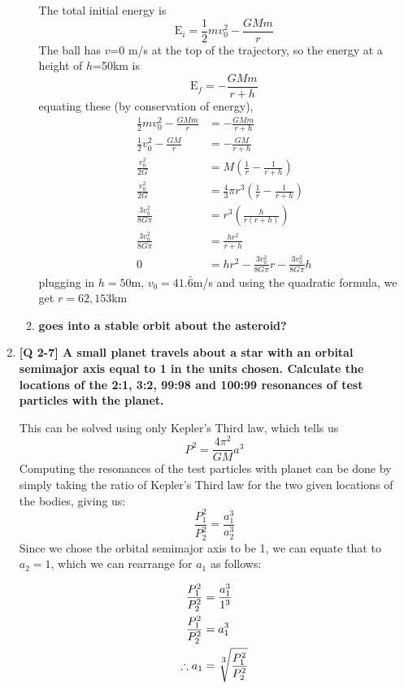\documentclass[10pt]{article}
\begin{document}
\begin{enumerate}
\begin{enumerate}
			The total initial energy is
			\[ \text{E}_i = \frac{1}{2}mv_0^2 - \frac{GMm}{r} \]
			The ball has $v$=0 m/s at the top of the trajectory, so the energy at a height of $h$=50km is
			\[ \text{E}_f = -\frac{GMm}{r + h} \]
			equating these (by conservation of energy),
			\begin{align*}
			    \frac{1}{2}mv_0^2 - \frac{GMm}{r} &= -\frac{GMm}{r+h}  \\
			    \frac{1}{2}v_0^2 - \frac{GM}{r} &= -\frac{GM}{r+h} \\
			    \frac{v_0^2}{2G} &= M\left(\frac{1}{r} - \frac{1}{r+h}\right) \\
			    \frac{v_0^2}{2G} &= \frac{4}{3}\pi r^3 \left(\frac{1}{r} - \frac{1}{r+h}\right)\\
			    \frac{3v_0^2}{8G\pi} &= r^3 \left(\frac{h}{r(r+h)}\right) \\
			    \frac{3v_0^2}{8G\pi} &= \frac{hr^2}{r+h} \\
			    0 &= hr^2 - \frac{3v_0^2}{8G\pi} r - \frac{3v_0^2}{8G\pi}h
			\end{align*}
			plugging in $h=50$m, $v_0 = 41.\bar{6}$m/s and using the quadratic formula, we get $r = 62,153$km
			
			\item  \textbf{goes into a stable orbit about the asteroid?}

		\end{enumerate}
		
		
		
		
		\newpage 
		\item  \textbf{ [Q 2-7] A small planet travels about a star with an orbital semimajor axis equal to 1 in the units chosen. Calculate the locations of the 2:1, 3:2, 99:98 and 100:99 resonances of test particles with the planet.}
		
		This can be solved using only Kepler's Third law, which tells us 
		\[P^2 = \frac{4\pi^2}{GM} a^3 \]
		Computing the resonances of the test particles with planet can be done by simply taking the ratio of Kepler's Third law for the two given locations of the bodies, giving us:
		\[ \frac{P_1^2}{P_2^2} = \frac{a_1^3}{a_2^3} \]
		Since we chose the orbital semimajor axis to be 1, we can equate that to $a_2 = 1$, which we can rearrange for $a_1$ as follows:
		
		\begin{align*}
			\frac{P_1^2}{P_2^2} &= \frac{a_1^3}{1^3} \\
			\frac{P_1^2}{P_2^2} &= a_1^3 \\
			\therefore a_1 &= \sqrt[\uproot{3}\scriptstyle 3]{\frac{P_1^2}{P_2^2}}
		\end{align*}
		

\end{enumerate}
\end{document}
